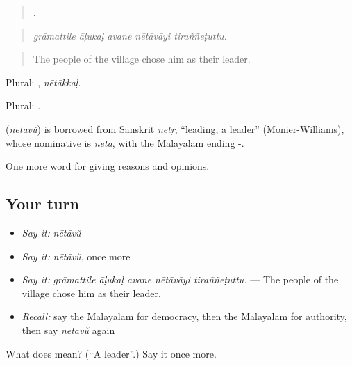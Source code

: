 \begin{quote}
    .
\end{quote}

\begin{quote}
\emph{grāmattile āḷukaḷ avane nētāvāyi tiraññeṭuttu.}
\end{quote}

\begin{quote}
The people of the village chose him as their leader.
\end{quote}

Plural: , \emph{nētākkaḷ}.

Plural: .

\begin{cousinweb}
\textbf{} (\emph{nētāvŭ}) is borrowed from Sanskrit \emph{netṛ}, \textquotedblleft{}leading, a leader\textquotedblright{} (Monier-Williams), whose nominative is \emph{netā}, with the Malayalam ending -.
\end{cousinweb}

\begin{grammarlens}[title={What you've built}]
One more word for giving reasons and opinions.
\end{grammarlens}

\subsection*{Your turn}
\begin{itemize}
\raggedright
  \item \emph{Say it:} \emph{nētāvŭ}
  \item \emph{Say it:} \emph{nētāvŭ}, once more
  \item \emph{Say it:} \emph{grāmattile āḷukaḷ avane nētāvāyi tiraññeṭuttu.} — The people of the village chose him as their leader.
  \item \emph{Recall:} say the Malayalam for democracy, then the Malayalam for authority, then say \emph{nētāvŭ} again
\end{itemize}

\begin{tcolorbox}[breakable,colback=teal!4,colframe=teal!35!black,title={Before you move on}]
What does  mean? (\textquotedblleft{}A leader\textquotedblright{}.) Say it once more.
\end{tcolorbox}
